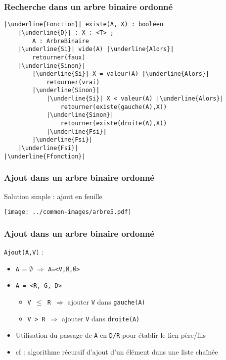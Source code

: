 \documentclass[table,handout,tikz,12pt,svgnames]{beamer}
\begin{document}
\begin{frame}[fragile=singleslide]
	\frametitle{Recherche dans un arbre binaire ordonné}
	\vspace{-0.1cm}
	\begin{verbatim}
|\underline{Fonction}| existe(A, X) : booléen
	|\underline{D}| : X : <T> ;
		A : ArbreBinaire
	|\underline{Si}| vide(A) |\underline{Alors}|
		retourner(faux)
	|\underline{Sinon}|
		|\underline{Si}| X = valeur(A) |\underline{Alors}|
			retourner(vrai)
		|\underline{Sinon}|
			|\underline{Si}| X < valeur(A) |\underline{Alors}|
				retourner(existe(gauche(A),X))
			|\underline{Sinon}|
				retourner(existe(droite(A),X))
			|\underline{Fsi}|
		|\underline{Fsi}|
	|\underline{Fsi}|
|\underline{Ffonction}|
		\end{verbatim}
\end{frame}


\begin{frame}[fragile=singleslide]
	\frametitle{Ajout dans un arbre binaire ordonné}
	\vspace{0.5cm}
	\begin{block}{Solution simple : ajout en feuille}
	\end{block}
	\begin{block}{}
		\vspace{-1.2cm}
		\begin{center}
			{\texttt{[image: ../common-images/arbre5.pdf]}}
		\end{center}
	\end{block}
\end{frame}


\begin{frame}[fragile=singleslide]
	\frametitle{Ajout dans un arbre binaire ordonné}
	\begin{block}{\texttt{Ajout(A,V)} :}
		\begin{itemize}
			\item \texttt{A} = $\emptyset$ $\Rightarrow$ \texttt{A=<V,$\emptyset$,$\emptyset$>}
			\item \texttt{A = <R, G, D>}
			\begin{itemize}
				\item \texttt{V $\leq$ R $\Rightarrow$} ajouter \texttt{V} dans \texttt{gauche(A)}
				\item \texttt{V > R $\Rightarrow$} ajouter \texttt{V} dans \texttt{droite(A)}
			\end{itemize}
			\item Utilisation du passage de \texttt{A} en \texttt{D/R} pour établir le lien père/fils
			\item cf : algorithme récursif d'ajout d'un élément dans une liste chaînée
		\end{itemize}
	\end{block}
\end{frame}
\end{document}
